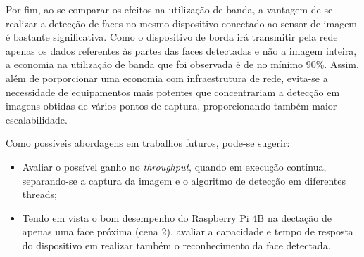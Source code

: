 Por fim, ao se comparar os efeitos na utilização de banda, a vantagem de se realizar a detecção de faces no mesmo dispositivo conectado ao sensor de imagem é bastante significativa. Como o dispositivo de borda irá transmitir pela rede apenas os dados referentes às partes das faces detectadas e não a imagem inteira, a economia na utilização de banda que foi observada é de no mínimo 90\%. Assim, além de porporcionar uma economia com infraestrutura de rede, evita-se a necessidade de equipamentos mais potentes que concentrariam a detecção em imagens obtidas de vários pontos de captura, proporcionando também maior escalabilidade.

Como possíveis abordagens em trabalhos futuros, pode-se sugerir:
\begin{itemize}
    \item Avaliar o possível ganho no \textit{throughput}, quando em execução contínua, separando-se a captura da imagem e o algoritmo de detecção em diferentes threads;
    \item Tendo em vista o bom desempenho do Raspberry Pi 4B na dectação de apenas uma face próxima (cena 2), avaliar a capacidade e tempo de resposta do dispositivo em realizar também o reconhecimento da face detectada.
\end{itemize}